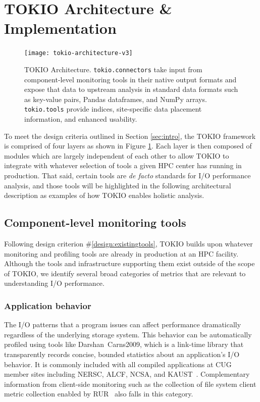 \section{TOKIO Architecture \& Implementation} \label{sec:architecture}

\begin{figure}
    \centering
    \texttt{[image: tokio-architecture-v3]}
    \vspace{-.3in}
    \caption{TOKIO Architecture.  \texttt{tokio.connectors} take input from component-level monitoring tools in their native output formats and expose that data to upstream analysis in standard data formats such as key-value pairs, Pandas dataframes, and NumPy arrays. \texttt{tokio.tools} provide indices, site-specific data placement information, and enhanced usability.}
    \label{fig:tokio-architecture}
    \vspace{-.2in}
\end{figure}

To meet the design criteria outlined in Section \ref{sec:intro}, the TOKIO framework is comprised of four layers as shown in Figure \ref{fig:tokio-architecture}.
Each layer is then composed of modules which are largely independent of each other to allow TOKIO to integrate with whatever selection of tools a given HPC center has running in production.
That said, certain tools are \emph{de facto} standards for I/O performance analysis, and those tools will be highlighted in the following architectural description as examples of how TOKIO enables holistic analysis.

\subsection{Component-level monitoring tools} \label{sec:architecture/components}

Following design criterion \#\ref{design:existingtools}, TOKIO builds upon whatever monitoring and profiling tools are already in production at an HPC facility.
Although the tools and infrastructure supporting them exist outside of the scope of TOKIO, we identify several broad categories of metrics that are relevant to understanding I/O performance.

\subsubsection{Application behavior} \label{sec:architecture/components/application}

The I/O patterns that a program issues can affect performance dramatically regardless of the underlying storage system.
This behavior can be automatically profiled using tools like Darshan~{Carns2009}, which is a link-time library that transparently records concise, bounded statistics about an application's I/O behavior.  
It is commonly included with all compiled applications at CUG member sites including NERSC, ALCF, NCSA, and KAUST~\cite{Lockwood2017,Luu:2015:HPDC,Hadri2015,White2017}.
Complementary information from client-side monitoring  such as the collection of file system client metric collection enabled by RUR~\cite{Butler2014} also falls in this category.

